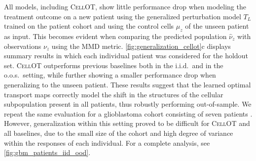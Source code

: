  All models, including \textsc{CellOT}, show little performance drop when modeling the treatment outcome on a new patient using the generalized perturbation model $T_L$ trained on the patient cohort and using the control cells $\mu_z$ of the unseen patient as input.
This becomes evident when comparing the predicted population $\hat{\nu}_z$ with observations $\nu_z$ using the \acrshort{MMD} metric. \cref{fig:generalization_cellot}c displays summary results in which each individual patient was considered for the holdout set. \textsc{CellOT} outperforms previous baselines both in the i.i.d.~and in the o.o.s.~setting, while further showing a smaller performance drop when generalizing to the unseen patient.
These results suggest that the learned optimal transport maps correctly model the shift in the structures of the cellular subpopulation present in all patients, thus robustly performing out-of-sample.
We repeat the same evaluation for a glioblastoma cohort consisting of seven patients \citep{zhao2021deconvolution}. However, generalization within this setting proved to be difficult for \textsc{CellOT} and all baselines, due to the small size of the cohort and high degree of variance within the responses of each individual. 
For a complete analysis, see \cref{fig:gbm_patients_iid_ood}.

